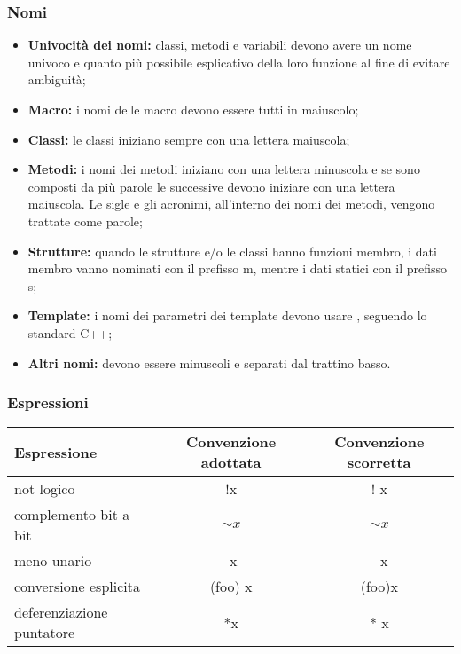 \documentclass[../NomeDocumento.tex]{subfiles}
\begin{document}
	\subsubsection{Nomi}
	\begin{itemize}
		\item \textbf{Univocità dei nomi:} classi, metodi e variabili devono avere un nome univoco e quanto più possibile esplicativo della loro funzione al fine di evitare ambiguità;
		
		\item \textbf{Macro:} i nomi delle macro devono essere tutti in maiuscolo;
		
		\item \textbf{Classi:} le classi iniziano sempre con una lettera maiuscola;
		
		\item \textbf{Metodi:} i nomi dei metodi iniziano con una lettera minuscola e se sono composti da più parole le successive devono iniziare con una lettera maiuscola. Le sigle e gli acronimi, all'interno dei nomi dei metodi, vengono trattate come parole;
		
		\item \textbf{Strutture:} quando le strutture e/o le classi hanno funzioni membro, i dati membro vanno nominati con il prefisso m\textunderscore , mentre i dati statici con il prefisso s\textunderscore;
		
		\item \textbf{Template:} i nomi dei parametri dei template devono usare , seguendo lo standard C++;
		
		\item \textbf{Altri nomi:} devono essere minuscoli e separati dal trattino basso.
	\end{itemize}	
	
	\subsubsection{Espressioni}
	\begin{center}
	\begin{tabular}{|l|c|c|}
		\hline
		Espressione&Convenzione adottata&Convenzione scorretta \\ \hline
		not logico&!x&! x \\ \hline
		complemento bit a bit&${\sim}x$&$\sim x$ \\ \hline
		meno unario&-x&- x \\ \hline
		conversione esplicita&(foo) x&(foo)x \\ \hline
		deferenziazione puntatore&*x&* x \\ \hline
	\end{tabular}
	\end{center}
	
\end{document}
